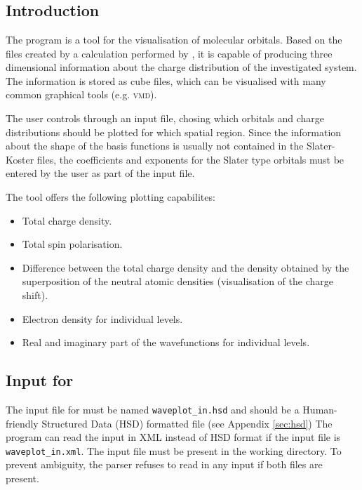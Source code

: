 \chapter{\waveplot}

\section{Introduction}

The \waveplot{} program is a tool for the visualisation of molecular
orbitals.  Based on the files created by a calculation performed by
\dftbp{}, it is capable of producing three dimensional information
about the charge distribution of the investigated system. The
information is stored as cube files, which can be visualised with many
common graphical tools (e.g. \textsc{vmd}).

The user controls \waveplot{} through an input file, chosing which
orbitals and charge distributions should be plotted for which spatial
region. Since the information about the shape of the basis functions
is usually not contained in the Slater-Koster files, the coefficients
and exponents for the Slater type orbitals must be entered by the user
as part of the input file.

The \waveplot{} tool offers the following plotting capabilites:
\begin{itemize}
\item Total charge density.
\item Total spin polarisation.
\item Difference between the total charge density and the density
  obtained by the superposition of the neutral atomic densities
  (visualisation of the charge shift).
\item Electron density for individual levels.
\item Real and imaginary part of the wavefunctions for individual levels.
\end{itemize}


\section{Input for \waveplot}

The input file for \waveplot{} must be named \verb|waveplot_in.hsd| and should
be a Human-friendly Structured Data (HSD) formatted file (see Appendix
\ref{sec:hsd}) The program can read the input in XML instead of HSD format if
the input file is \verb|waveplot_in.xml|. The input file must be present in the
working directory. To prevent ambiguity, the parser refuses to read in any input
if both files are present.

